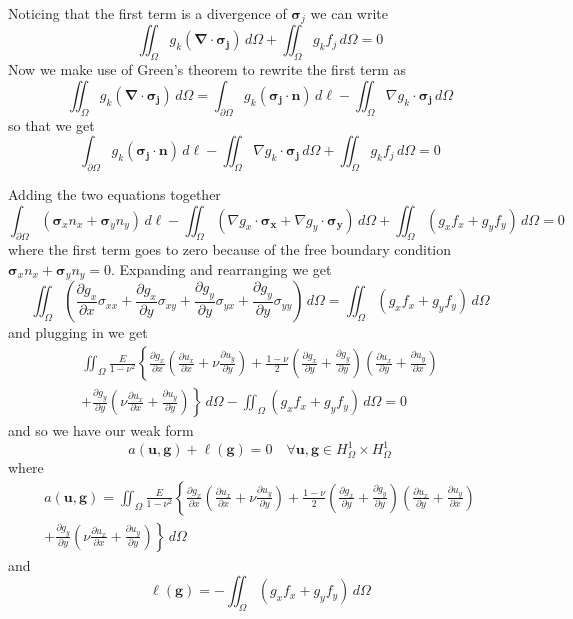 \documentclass[11pt]{article}
\newcommand\p[2]{\frac{\partial #1}{\partial #2}}
\begin{document}
Noticing that the first term is a divergence of $\bm{\sigma}_j$ we can write
\begin{equation}
\iint_\Omega g_k \left( \bm{\nabla \cdot \sigma_j} \right) \, d\Omega + \iint_\Omega g_k f_j \, d\Omega = 0
\end{equation}
Now we make use of Green's theorem to rewrite the first term as
\begin{equation}
  \iint_\Omega g_k \left( \bm{\nabla \cdot \sigma_j} \right) \, d\Omega
  = \int_{\partial\Omega} g_k  \left( \bm{\sigma_j \cdot n} \right) \, d\ell
  - \iint_\Omega \nabla g_k \cdot \bm{\sigma_j} \, d\Omega
\end{equation}
so that we get
\begin{equation}
  \int_{\partial\Omega} g_k  \left( \bm{\sigma_j \cdot n} \right) \, d\ell
  - \iint_\Omega \nabla g_k \cdot \bm{\sigma_j} \, d\Omega
  + \iint_\Omega g_k f_j \, d\Omega = 0
\end{equation}

Adding the two equations together
\begin{equation}
    \int_{\partial\Omega} \left( \bm{\sigma}_x n_x + \bm{\sigma}_y n_y \right) \, d\ell
  - \iint_\Omega \left( \nabla g_x \cdot \bm{\sigma_x} + \nabla g_y \cdot \bm{\sigma_y} \right) \, d\Omega
  + \iint_\Omega \left( g_x f_x + g_y f_y \right) \, d\Omega = 0
\end{equation}
where the first term goes to zero because of the free boundary condition  $\bm{\sigma}_x n_x + \bm{\sigma}_y n_y = 0$. Expanding and rearranging we get
\begin{equation}
  \iint_\Omega \left( \p{g_x}{x}\sigma_{xx} + \p{g_x}{y}\sigma_{xy} + \p{g_y}{y}\sigma_{yx} + \p{g_y}{y}\sigma_{yy} \right) \, d\Omega = \iint_\Omega \left( g_x f_x + g_y f_y \right) \, d\Omega
\end{equation}
and plugging in we get
\begin{multline}
  \iint_\Omega \frac{E}{1-\nu^2} \left\{
    \p{g_x}{x} \left( \p{u_x}{x} + \nu\p{u_y}{y} \right)
    + \frac{1-\nu}{2} \left( \p{g_x}{y} + \p{g_y}{y} \right)
      \left( \p{u_x}{y} + \p{u_y}{x} \right) \right. \\ \left.
    + \p{g_y}{y} \left(\nu\p{u_x}{x} + \p{u_y}{y} \right)
  \right\} \, d\Omega
  - \iint_\Omega \left( g_x f_x + g_y f_y \right) \, d\Omega
  = 0
\end{multline}
and so we have our weak form
\begin{equation}
  a(\bm{u,g}) + \ell(\bm{g}) = 0 \quad \forall \bm{u,g} \in H^1_\Omega \times H^1_\Omega
\end{equation}
where
\begin{multline}
  a(\bm{u,g}) =
  \iint_\Omega \frac{E}{1-\nu^2} \left\{
    \p{g_x}{x} \left( \p{u_x}{x} + \nu\p{u_y}{y} \right)
    + \frac{1-\nu}{2} \left( \p{g_x}{y} + \p{g_y}{y} \right)
      \left( \p{u_x}{y} + \p{u_y}{x} \right) \right. \\ \left.
    + \p{g_y}{y} \left(\nu\p{u_x}{x} + \p{u_y}{y} \right)
  \right\} \, d\Omega
\end{multline}
and
\begin{equation}
  \ell(\bm{g}) = - \iint_\Omega \left( g_x f_x + g_y f_y \right) \, d\Omega
\end{equation}
\end{document}
